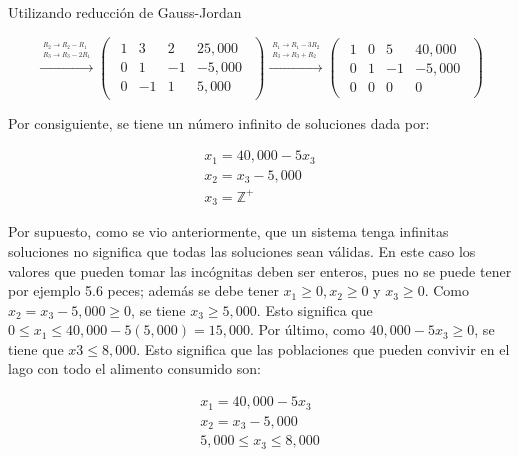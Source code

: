 \documentclass{article}
\begin{document}
Utilizando reducción de Gauss-Jordan

\begin{equation*}
    \xrightarrow{\overset{\begin{aligned} R_2 \rightarrow R_2 - R_1 \\ R_3 \rightarrow R_3 - 2R_1\end{aligned}}{}} 
    \begin{pmatrix}
        \begin{array}{rrr|r}
            1& 3 & 2 & 25,000\\
            0 & 1 &-1 &-5,000 \\
            0 & -1 & 1 & 5,000
        \end{array}
    \end{pmatrix}
    \xrightarrow{\overset{\begin{aligned} R_1 \rightarrow R_1 - 3R_2 \\ R_3 \rightarrow R_3 + R_2\end{aligned}}{}} 
    \begin{pmatrix}
        \begin{array}{rrr|r}
            1 & 0 & 5 & 40,000\\
            0 & 1 & -1 & -5,000\\
            0 & 0 & 0 & 0
        \end{array}
    \end{pmatrix}
\end{equation*}

Por consiguiente, se tiene un número infinito de soluciones dada por: 

\begin{equation*}
    \begin{aligned}
        x_1 = 40,000 - 5x_3\\
        x_2 = x_3 - 5,000\\
        x_3 = \mathbb{Z}^+
    \end{aligned}
\end{equation*}

Por supuesto, como se vio anteriormente, que un sistema tenga infinitas soluciones no significa que todas las soluciones sean válidas. En este caso los valores que pueden tomar las incógnitas deben ser enteros, pues no se puede tener por ejemplo 5.6 peces; además se debe tener $x_1 \geq 0, x_2 \geq 0$ y $x_3 \geq 0$. Como $x_2 = x_3 - 5,000 \geq 0$, se tiene $x_3 \geq 5,000$. Esto significa que $0 \leq x_1 \leq 40,000 - 5(5,000)= 15,000$. Por último, como $40,000 - 5x_3 \geq 0$, se tiene que $x3 \leq 8,000$. Esto significa que las poblaciones que pueden convivir en el lago con todo el alimento consumido son: 

\begin{equation*}
    \begin{aligned}
        x_1 = 40,000 -5x_3\\
        x_2 = x_3 - 5,000\\
        5,000 \leq x_3 \leq 8,000
    \end{aligned}
\end{equation*}
\end{document}
